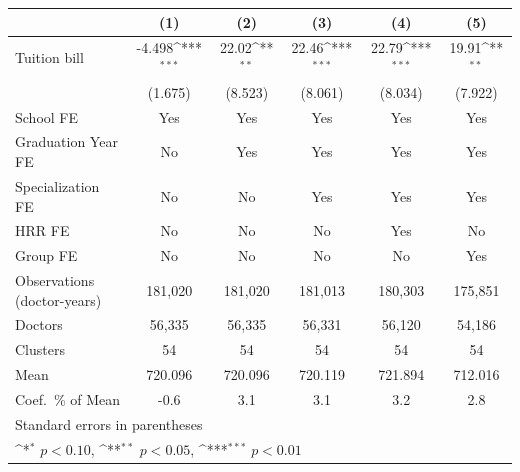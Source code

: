 {
\def\sym#1{\ifmmode^{#1}\else\(^{#1}\)\fi}
\begin{tabular}{l*{5}{c}}
\hline\hline
                    &\multicolumn{1}{c}{(1)}         &\multicolumn{1}{c}{(2)}         &\multicolumn{1}{c}{(3)}         &\multicolumn{1}{c}{(4)}         &\multicolumn{1}{c}{(5)}         \\
\hline
Tuition bill        &      -4.498\sym{***}&       22.02\sym{**} &       22.46\sym{***}&       22.79\sym{***}&       19.91\sym{**} \\
                    &     (1.675)         &     (8.523)         &     (8.061)         &     (8.034)         &     (7.922)         \\
[1em]
School FE           &         Yes         &         Yes         &         Yes         &         Yes         &         Yes         \\
[1em]
Graduation Year FE  &          No         &         Yes         &         Yes         &         Yes         &         Yes         \\
[1em]
Specialization FE   &          No         &          No         &         Yes         &         Yes         &         Yes         \\
[1em]
HRR FE              &          No         &          No         &          No         &         Yes         &          No         \\
[1em]
Group FE            &          No         &          No         &          No         &          No         &         Yes         \\
\hline
Observations (doctor-years)&     181,020         &     181,020         &     181,013         &     180,303         &     175,851         \\
Doctors             &      56,335         &      56,335         &      56,331         &      56,120         &      54,186         \\
Clusters            &          54         &          54         &          54         &          54         &          54         \\
Mean                &     720.096         &     720.096         &     720.119         &     721.894         &     712.016         \\
Coef.\ \% of Mean   &        -0.6         &         3.1         &         3.1         &         3.2         &         2.8         \\
\hline\hline
\multicolumn{6}{l}{\footnotesize Standard errors in parentheses}\\
\multicolumn{6}{l}{\footnotesize \sym{*} \(p<0.10\), \sym{**} \(p<0.05\), \sym{***} \(p<0.01\)}\\
\end{tabular}
}
